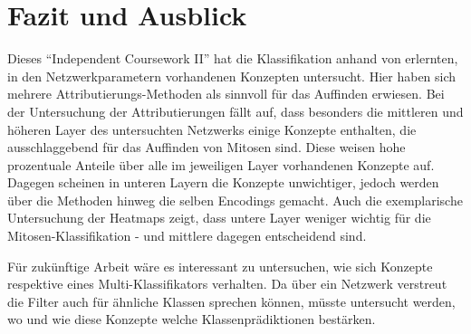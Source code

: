 \section{Fazit und Ausblick}

Dieses ``Independent Coursework II'' hat die Klassifikation anhand von erlernten, in den Netzwerkparametern vorhandenen Konzepten untersucht. Hier haben sich mehrere Attributierungs-Methoden als sinnvoll für das Auffinden erwiesen.
Bei der Untersuchung der Attributierungen fällt auf, dass besonders die mittleren und höheren Layer des untersuchten Netzwerks einige Konzepte enthalten, die ausschlaggebend für das Auffinden von Mitosen sind. Diese weisen hohe prozentuale Anteile über alle im jeweiligen Layer vorhandenen Konzepte auf. Dagegen scheinen in unteren Layern die Konzepte unwichtiger, jedoch werden über die Methoden hinweg die selben Encodings gemacht.
Auch die exemplarische Untersuchung der Heatmaps zeigt, dass untere Layer weniger wichtig für die Mitosen-Klassifikation - und mittlere dagegen entscheidend sind.

Für zukünftige Arbeit wäre es interessant zu untersuchen, wie sich Konzepte respektive eines Multi-Klassifikators verhalten. Da über ein Netzwerk verstreut die Filter auch für ähnliche Klassen sprechen können, müsste untersucht werden, wo und wie diese Konzepte welche Klassenprädiktionen bestärken.
